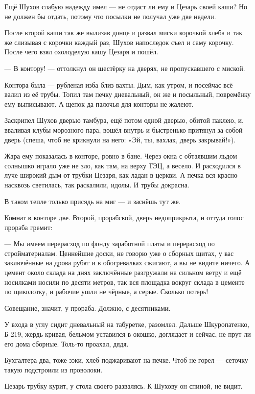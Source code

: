 Ещё Шухов слабую надежду имел --- не отдаст ли ему и Цезарь своей каши? Но не должен бы отдать,
потому что посылки не получал уже две недели.

После второй каши так же вылизав донце и развал миски корочкой хлеба и так же слизывая с
корочки каждый раз, Шухов напоследок съел и саму корочку. После чего взял охолоделую кашу
Цезаря и пошёл.

--- В контору! --- оттолкнул он шестёрку на дверях, не пропускавшего с миской.

Контора была --- рубленая изба близ вахты. Дым, как утром, и посейчас всё валил из её трубы.
Топил там печку дневальный, он же и посыльный, повремёнку ему выписывают. А щепок да палочья
для конторы не жалеют.

Заскрипел Шухов дверью тамбура, ещё потом одной дверью, обитой паклею, и, вваливая клубы
морозного пара, вошёл внутрь и быстренько притянул за собой дверь (спеша, чтоб не крикнули на
него: «Эй, ты, вахлак, дверь закрывай!»).

Жара ему показалась в конторе, ровно в бане. Через окна с обтаявшим льдом солнышко играло уже
не зло, как там, на верху ТЭЦ, а весело. И расходился в луче широкий дым от трубки Цезаря, как
ладан в церкви. А печка вся красно насквозь светилась, так раскалили, идолы. И трубы докрасна.

В таком тепле только присядь на миг --- и заснёшь тут же.

Комнат в конторе две. Второй, прорабской, дверь недоприкрыта, и оттуда голос прораба гремит:

--- Мы имеем перерасход по фонду заработной платы и перерасход по стройматериалам. Ценнейшие
доски, не говорю уже о сборных щитах, у вас заключённые на дрова рубят и в обогревалках
сжигают, а вы не видите ничего. А цемент около склада на днях заключённые разгружали на
сильном ветру и ещё носилками носили по десяти метров, так вся площадка вокруг склада в
цементе по щиколотку, и рабочие ушли не чёрные, а серые. Сколько потерь!

Совещание, значит, у прораба. Должно, с десятниками.

У входа в углу сидит дневальный на табуретке, разомлел. Дальше Шкуропатенко, Б-219, жердь
кривая, бельмом уставился в окошко, доглядает и сейчас, не прут ли его дома сборные. Толь-то
проахал, дядя.

Бухгалтера два, тоже зэки, хлеб поджаривают на печке. Чтоб не горел --- сеточку такую
подстроили из проволоки.

Цезарь трубку курит, у стола своего развалясь. К Шухову он спиной, не видит.


